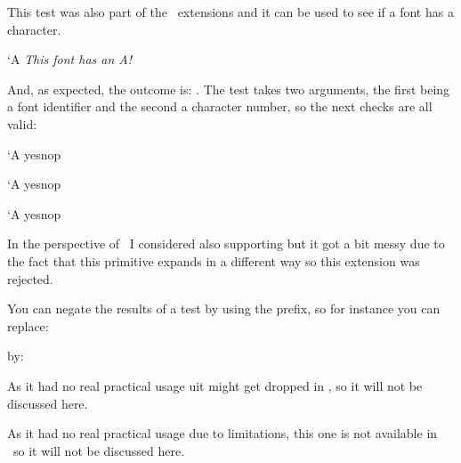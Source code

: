 \stopsectionlevel

\startsectionlevel[title={\tex{iffontchar}}]

This test was also part of the \ETEX\ extensions and it can be used to see if
a font has a character.

\startbuffer
\iffontchar\font`A
    {\em This font has an A!}
\fi
\stopbuffer

\typebuffer[option=TEX]

And, as expected, the outcome is: \quotation {\inlinebuffer}. The test takes two
arguments, the first being a font identifier and the second a character number,
so the next checks are all valid:

\starttyping[option=TEX]
\iffontchar\font     `A yes\else nop\fi\par
\iffontchar\nullfont `A yes\else nop\fi\par
\iffontchar{}`A yes\else nop\fi\par
\stoptyping

In the perspective of \LUAMETATEX\ I considered also supporting \type {\fontid}
but it got a bit messy due to the fact that this primitive expands in a different
way so this extension was rejected.

\stopsectionlevel

\startsectionlevel[title={\tex{unless}}]

You can negate the results of a test by using the \type {\unless} prefix, so for
instance you can replace:

\starttyping[option=TEX]
\ifdim\scratchdimen=10pt
    \dosomething
\else\ifdim\scratchdimen<10pt
    \dosomething
\fi\fi
\stoptyping

by:

\starttyping[option=TEX]
\unless\ifdim\scratchdimen>10pt
    \dosomething
\fi
\stoptyping

\stopsectionlevel

\stopsectionlevel

\startsectionlevel[title={\LUATEX\ primitives}]

\startsectionlevel[title={\tex{ifincsname}}]

As it had no real practical usage uit might get dropped in \LUAMETATEX, so it
will not be discussed here.

\stopsectionlevel

\startsectionlevel[title={\tex{ifprimitive}}]

As it had no real practical usage due to limitations, this one is not available
in \LUAMETATEX\ so it will not be discussed here.

